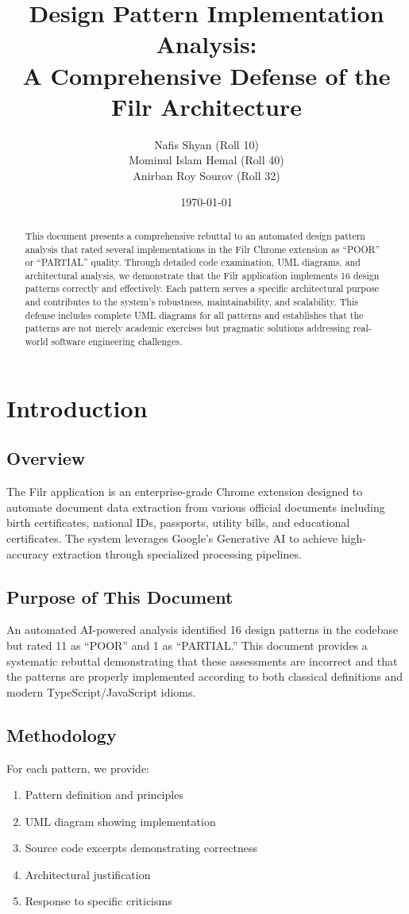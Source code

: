\documentclass[11pt]{article}
\title{\textbf{Design Pattern Implementation Analysis:\\
A Comprehensive Defense of the Filr Architecture}}
\author{
    Nafis Shyan (Roll 10) \\
    Mominul Islam Hemal (Roll 40) \\
    Anirban Roy Sourov (Roll 32)
}
\date{\today}
\begin{document}
\maketitle

\begin{abstract}
This document presents a comprehensive rebuttal to an automated design pattern analysis that rated several implementations in the Filr Chrome extension as ``POOR'' or ``PARTIAL'' quality. Through detailed code examination, UML diagrams, and architectural analysis, we demonstrate that the Filr application implements 16 design patterns correctly and effectively. Each pattern serves a specific architectural purpose and contributes to the system's robustness, maintainability, and scalability. This defense includes complete UML diagrams for all patterns and establishes that the patterns are not merely academic exercises but pragmatic solutions addressing real-world software engineering challenges.
\end{abstract}

\tableofcontents
\newpage

\section{Introduction}

\subsection{Overview}
The Filr application is an enterprise-grade Chrome extension designed to automate document data extraction from various official documents including birth certificates, national IDs, passports, utility bills, and educational certificates. The system leverages Google's Generative AI to achieve high-accuracy extraction through specialized processing pipelines.

\subsection{Purpose of This Document}
An automated AI-powered analysis identified 16 design patterns in the codebase but rated 11 as ``POOR'' and 1 as ``PARTIAL.'' This document provides a systematic rebuttal demonstrating that these assessments are incorrect and that the patterns are properly implemented according to both classical definitions and modern TypeScript/JavaScript idioms.

\subsection{Methodology}
For each pattern, we provide:
\begin{enumerate}[noitemsep]
    \item Pattern definition and principles
    \item UML diagram showing implementation
    \item Source code excerpts demonstrating correctness
    \item Architectural justification
    \item Response to specific criticisms
\end{enumerate}
\end{document}
